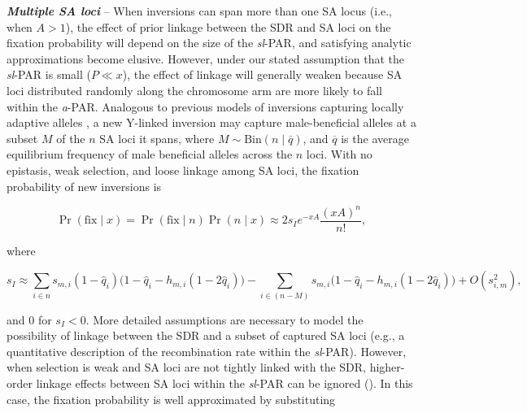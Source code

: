 \documentclass{article}
\begin{document}
 \vspace{12pt}

{\bf \itshape Multiple SA loci} -- When inversions can span more than one SA locus (i.e., when $A > 1$), the effect of prior linkage between the SDR and SA loci on the fixation probability will depend on the size of the {\itshape sl}-PAR, and satisfying analytic approximations become elusive. However, under our stated assumption that the {\itshape sl}-PAR is small ($P \ll x$), the effect of linkage will generally weaken because SA loci distributed randomly along the chromosome arm are more likely to fall within the {\itshape a}-PAR. Analogous to previous models of inversions capturing locally adaptive alleles \citep{KirkpatrickBarton2003, Connallon2018}, a new Y-linked inversion may capture male-beneficial alleles at a subset $M$ of the $n$ SA loci it spans, where $M \sim \text{Bin}(n \mid \overline{q})$, and $\overline{q}$ is the average equilibrium frequency of male beneficial alleles across the $n$ loci. With no epistasis, weak selection, and loose linkage among SA loci, the fixation probability of new inversions is

\begin{equation}\label{eq:SApFixMultiLoc}
	\Pr(\text{fix} \mid x) = \Pr(\text{fix} \mid n) \Pr(n \mid x) \approx 2 s_I e^{-x A} \frac{(xA)^n}{n!},
\end{equation}

\noindent where

\begin{equation}\label{eq:SASIMultiLoc}
	s_I \approx \sum_{i \in n} s_{m,i} (1 - \hat{q}_{i}) \big( 1 - \hat{q}_i - h_{m,i} (1 - 2 \hat{q}_i) \big) - \sum_{i \in (n-M)} s_{m,i} \big( 1 - \hat{q}_i - h_{m,i} (1 - 2 \hat{q}_i) \big) + O(s_{i,m}^2),
\end{equation}

\noindent and $0$ for $s_I < 0$. More detailed assumptions are necessary to model the possibility of linkage between the SDR and a subset of captured SA loci (e.g., a quantitative description of the recombination rate within the {\itshape sl}-PAR). However, when selection is weak and SA loci are not tightly linked with the SDR, higher-order linkage effects between SA loci within the {\itshape sl}-PAR can be ignored (\citealt{Otto2019}). In this case, the fixation probability is well approximated by substituting 
\end{document}
